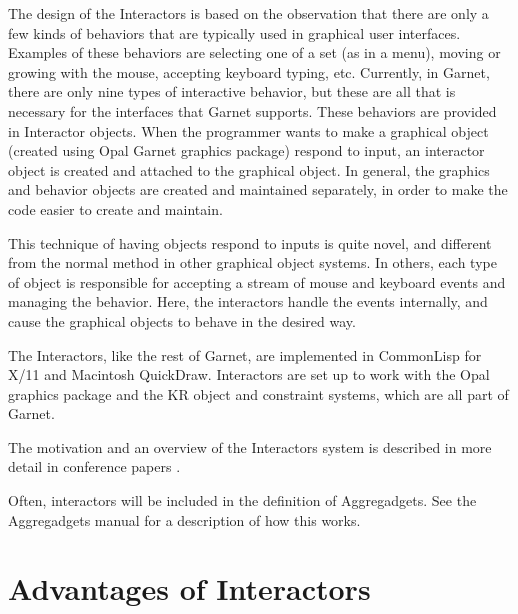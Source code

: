 The design of the Interactors is based on the observation that there are
only a few kinds of behaviors that are typically used in graphical user
interfaces.  Examples of these behaviors are selecting one of a set (as in a
menu), moving or growing with the mouse, accepting keyboard typing, etc.
Currently, in Garnet, there are only nine types of interactive behavior,
but these are all that is necessary for the interfaces that Garnet
supports.  These behaviors are provided in Interactor objects.  When the
programmer wants to make a graphical object (created using Opal\dashthe
Garnet graphics package) respond to input, an
interactor object is created and attached to the graphical object.  In
general, the graphics and behavior objects are created and maintained
separately, in order to make the code easier to create and maintain.

This technique of having objects respond to inputs is quite novel, and
different from the normal method in other graphical object systems.  In
others, each type of object is responsible for accepting a stream of mouse
and keyboard events and managing the behavior.  Here, the interactors
handle the events internally, and cause the graphical objects to behave in
the desired way.

The Interactors, like the rest of Garnet, are implemented in CommonLisp for
X/11 and Macintosh QuickDraw.   Interactors are set up to work with the Opal
graphics package and the KR object and constraint systems, which are all
part of Garnet.

The motivation and an overview of the Interactors system is described in
more detail in conference papers \cite{Interactors, InterTOIS}.

Often, interactors will be included in the definition of Aggregadgets.  See
the Aggregadgets manual for a description of how this works.

\section{Advantages of Interactors}

